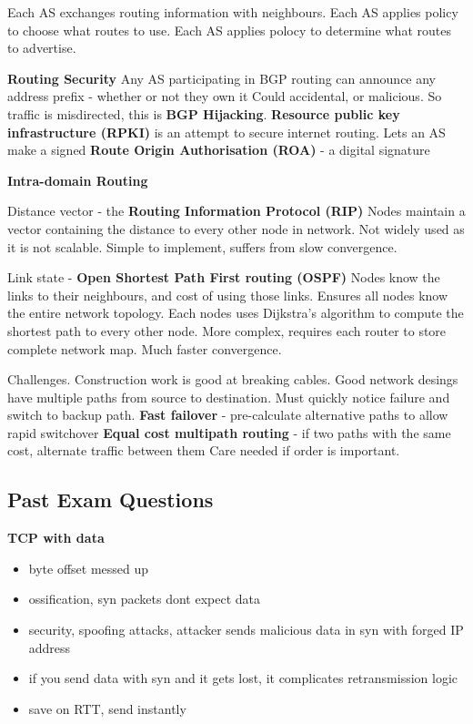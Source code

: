 \documentclass{article}
\begin{document}
Each AS exchanges routing information with neighbours.
Each AS applies policy to choose what routes to use.
Each AS applies polocy to determine what routes to advertise.

\vspace{\baselineskip}
\textbf{Routing Security}
Any AS participating in BGP routing can announce any address prefix {-} whether or not they own it
Could accidental, or malicious.
So traffic is misdirected, this is \textbf{BGP Hijacking}.
\textbf{Resource public key infrastructure (RPKI)} is an attempt to secure internet routing.
Lets an AS make a signed \textbf{Route Origin Authorisation (ROA)} {-} a digital signature

\vspace{\baselineskip}

\textbf{Intra-domain Routing}

Distance vector {-} the \textbf{Routing Information Protocol (RIP)}
Nodes maintain a vector containing the distance to every other node in network.
Not widely used as it is not scalable. Simple to implement, suffers from slow convergence.

Link state {-} \textbf{Open Shortest Path First routing (OSPF)}
Nodes know the links to their neighbours, and cost of using those links.
Ensures all nodes know the entire network topology.
Each nodes uses Dijkstra's algorithm to compute the shortest path to every other node.
More complex, requires each router to store complete network map. Much faster convergence.

Challenges. Construction work is good at breaking cables. Good network desings have multiple paths from source to destination.
Must quickly notice failure and switch to backup path.
\textbf{Fast failover} {-} pre-calculate alternative paths to allow rapid switchover
\textbf{Equal cost multipath routing} {-} if two paths with the same cost, alternate traffic between them
Care needed if order is important.

\clearpage

\subsection*{Past Exam Questions}

\textbf{TCP with data}
\begin{itemize}
    \item byte offset messed up
    \item ossification, syn packets dont expect data
    \item security, spoofing attacks, attacker sends malicious data in syn with forged IP address
    \item if you send data with syn and it gets lost, it complicates retransmission logic
    \item save on RTT, send instantly
\end{itemize}
\end{document}
